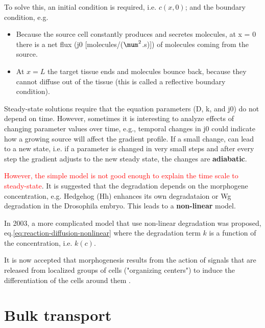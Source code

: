 To solve this, an initial condition is required, i.e. $c(x,0)$; and the boundary
condition, e.g. 
\begin{itemize}
  \item  Because the source cell constantly produces and secretes molecules, at
  x = 0 there is a net flux (j0 [molecules/($\mum^2$.s)]) of molecules coming
  from the source.

  \item At $x = L$ the target tissue ends and molecules bounce back,
because they cannot diffuse out of the tissue (this is called a reflective
boundary condition).
\end{itemize}
Steady-state solutions require that the equation parameters (D, k, and j0) do
  not depend on time. However, sometimes it is interesting to analyze effects of
  changing parameter values over time, e.g., temporal changes in j0 could
  indicate how a growing source will affect the gradient profile.
If a small change, can lead to a new state, i.e.
if a parameter is changed in very small steps and after every step the gradient
adjusts to the new steady state, the changes are {\bf adiabatic}.
  
\textcolor{red}{However, the simple model is not good enough to explain the time
scale to steady-state}. It is suggested that the degradation depends on the
morphogene concentration, e.g.  Hedgehog (Hh) enhances its own degradataion or
Wg degradation in the Drosophila embryo.
This leads to a {\bf non-linear} model.

In 2003, a more complicated model that use non-linear degradation was proposed,
eq.\ref{eq:reaction-diffusion-nonlinear} where the degradation term $k$ is a
function of the concentration, i.e. $k(c)$.




 
It is now accepted that morphogenesis results from the action of signals that
are released from localized groups of cells ("organizing centers") to induce the
differentiation of the cells around them \citep{de-robertis2006}.



\section{Bulk transport}

